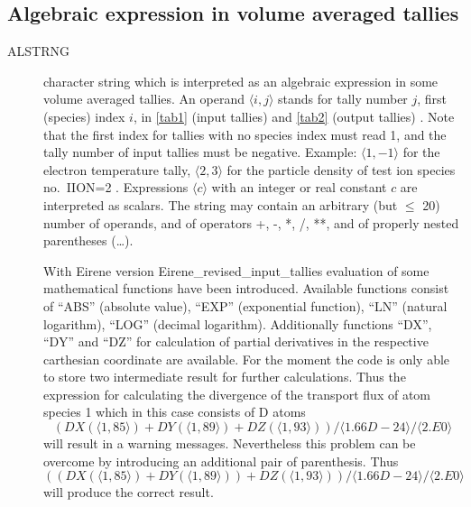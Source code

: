 \subsection{Algebraic expression in volume averaged tallies}\label{sec2.10C}

\begin{description}
  \item[ALSTRNG] character string which is interpreted as an
        algebraic expression in some volume averaged tallies.
        An operand $\langle i,j \rangle$ stands for tally number $j$, first (species)
        index $i$, in \cref{tab1} (input tallies) and \cref{tab2} (output tallies) .
        Note that the first index for tallies with no species index must read 1, and
        the tally number of input tallies must be negative.
        Example: $\langle 1,-1\rangle$ for the electron temperature tally, $\langle
          2,3\rangle$ for the particle density of test ion species no.\ IION=2 .
        Expressions $\langle c\rangle$ with an integer or real constant $c$ are
        interpreted as scalars.
        The string may contain an arbitrary (but $\le$ 20) number of operands, and of
        operators +, -, *, /, **, and of properly nested parentheses (\dots).

        With Eirene version Eirene\_revised\_input\_tallies evaluation of some mathematical
        functions have been introduced.
        Available functions consist of ``ABS'' (absolute value), ``EXP'' (exponential
        function), ``LN'' (natural logarithm), ``LOG'' (decimal logarithm).
        Additionally functions ``DX'', ``DY'' and ``DZ'' for calculation of partial
        derivatives in the respective carthesian coordinate are available.
        For the moment the code is only able to store two intermediate result for
        further calculations.
        Thus the expression for calculating the divergence of the transport
        flux of atom species 1 which in this case consists of D atoms
        \begin{equation*}
          (DX( \langle 1,85 \rangle) + DY(\langle 1,89 \rangle) + DZ(\langle 1,93
          \rangle)) / \langle 1.66D-24 \rangle / \langle 2.E0 \rangle
        \end{equation*}
        will result in a warning messages.
        Nevertheless this problem can be overcome by introducing an additional pair of
        parenthesis.
        Thus
        \begin{equation*}
          ((DX( \langle 1,85 \rangle) + DY(\langle 1,89 \rangle)) + DZ(\langle 1,93
          \rangle)) / \langle 1.66D-24 \rangle / \langle 2.E0 \rangle
        \end{equation*}
        will produce the correct result.


\end{description}
